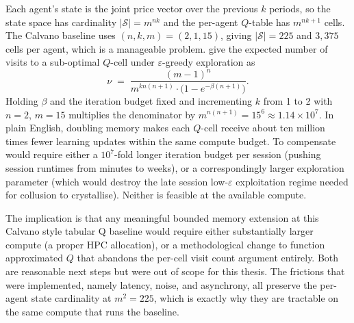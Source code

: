 Each agent's state is the joint price vector over the previous $k$ periods, so the state space has cardinality $|\mathcal{S}| = m^{nk}$ and the per-agent $Q$-table has $m^{nk+1}$ cells. The Calvano baseline uses $(n,k,m)=(2,1,15)$, giving $|\mathcal{S}|=225$ and $3{,}375$ cells per agent, which is a manageable problem. \citet[footnote to eq.~21]{calvano2020} give the expected number of visits to a sub-optimal $Q$-cell under $\varepsilon$-greedy exploration as
\begin{equation}
    \nu \;=\; \frac{(m-1)^{n}}{m^{kn(n+1)} \cdot \bigl(1 - e^{-\beta(n+1)}\bigr)}.
    \label{eq:nu}
\end{equation}
Holding $\beta$ and the iteration budget fixed and incrementing $k$ from 1 to 2 with $n=2$, $m=15$ multiplies the denominator by $m^{n(n+1)} = 15^{6} \approx 1.14\times 10^{7}$. In plain English, doubling memory makes each $Q$-cell receive about ten million times fewer learning updates within the same compute budget. To compensate would require either a $10^{7}$-fold longer iteration budget per session (pushing session runtimes from minutes to weeks), or a correspondingly larger exploration parameter (which would destroy the late session low-$\varepsilon$ exploitation regime needed for collusion to crystallise). Neither is feasible at the available compute.

The implication is that any meaningful bounded memory extension at this Calvano style tabular Q baseline would require either substantially larger compute (a proper HPC allocation), or a methodological change to function approximated $Q$ that abandons the per-cell visit count argument entirely. Both are reasonable next steps but were out of scope for this thesis. The frictions that were implemented, namely latency, noise, and asynchrony, all preserve the per-agent state cardinality at $m^{2}=225$, which is exactly why they are tractable on the same compute that runs the baseline.

